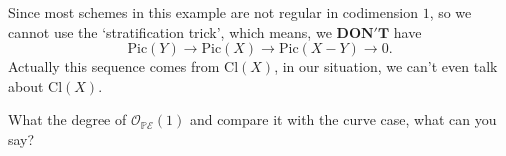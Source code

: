 \documentclass[../main.tex]{subfiles}
\begin{document}
\begin{remark}
\end{remark}
\begin{remark}
Since most schemes in this example are not regular in codimension $1$, so we cannot use the `stratification trick', which means, we $\mathbf{DON'T}$ have
$$\mathrm{Pic}(Y)\rightarrow \mathrm{Pic}(X)\rightarrow \mathrm{Pic}(X-Y)\rightarrow 0.$$
Actually this sequence comes from $\mathrm{Cl}(X)$, in our situation, we can't even talk about $\mathrm{Cl}(X).$
\end{remark}





\begin{example}

\end{example}


\begin{example}

\end{example}
\begin{remark}
What the degree of $\mathcal{O}_{\mathbb{P}\mathscr{E}}(1)$ and compare it with the curve case, what can you say?
\end{remark}
\end{document}
